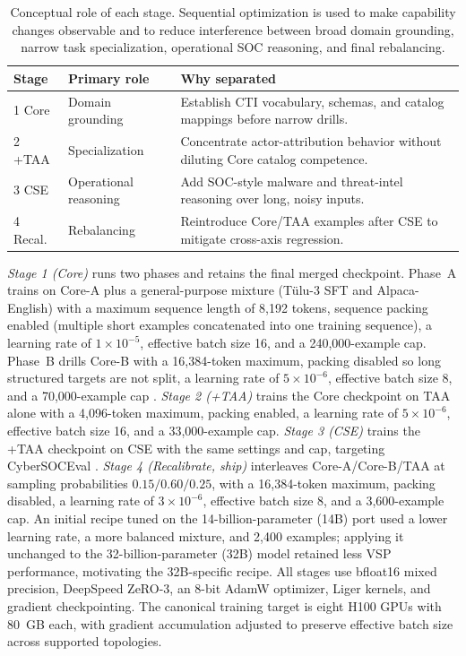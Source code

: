 \documentclass[conference]{IEEEtran}
\begin{document}
\begin{table}[t]
\centering
\caption{Conceptual role of each stage. Sequential optimization is used to make capability changes observable and to reduce interference between broad domain grounding, narrow task specialization, operational SOC reasoning, and final rebalancing.}
\label{tab:stage-rationale}
\footnotesize
\setlength{\tabcolsep}{3pt}
\begin{tabular}{p{1.05cm}p{2.0cm}p{3.65cm}}
\hline
\textbf{Stage} & \textbf{Primary role} & \textbf{Why separated} \\
\hline
1 Core & Domain grounding & Establish CTI vocabulary, schemas, and catalog mappings before narrow drills. \\
2 +TAA & Specialization & Concentrate actor-attribution behavior without diluting Core catalog competence. \\
3 CSE & Operational reasoning & Add SOC-style malware and threat-intel reasoning over long, noisy inputs. \\
4 Recal. & Rebalancing & Reintroduce Core/TAA examples after CSE to mitigate cross-axis regression. \\
\hline
\end{tabular}
\end{table}

\emph{Stage 1 (Core)} runs two phases and retains the final merged checkpoint. Phase~A trains on Core-A plus a general-purpose mixture (Tülu-3 SFT and Alpaca-English) with a maximum sequence length of 8,192 tokens, sequence packing enabled (multiple short examples concatenated into one training sequence), a learning rate of $1\times10^{-5}$, effective batch size 16, and a 240,000-example cap. Phase~B drills Core-B with a 16,384-token maximum, packing disabled so long structured targets are not split, a learning rate of $5\times10^{-6}$, effective batch size 8, and a 70,000-example cap \cite{alam2025athenabench,chung2022flant5,gururangan2020dontstop}. \emph{Stage 2 (+TAA)} trains the Core checkpoint on TAA alone with a 4,096-token maximum, packing enabled, a learning rate of $5\times10^{-6}$, effective batch size 16, and a 33,000-example cap. \emph{Stage 3 (CSE)} trains the +TAA checkpoint on CSE with the same settings and cap, targeting CyberSOCEval \cite{cybersoceval2025}. \emph{Stage 4 (Recalibrate, ship)} interleaves Core-A/Core-B/TAA at sampling probabilities $0.15/0.60/0.25$, with a 16,384-token maximum, packing disabled, a learning rate of $3\times10^{-6}$, effective batch size 8, and a 3,600-example cap. An initial recipe tuned on the 14-billion-parameter (14B) port used a lower learning rate, a more balanced mixture, and 2,400 examples; applying it unchanged to the 32-billion-parameter (32B) model retained less VSP performance, motivating the 32B-specific recipe. All stages use bfloat16 mixed precision, DeepSpeed ZeRO-3, an 8-bit AdamW optimizer, Liger kernels, and gradient checkpointing. The canonical training target is eight H100 GPUs with 80~GB each, with gradient accumulation adjusted to preserve effective batch size across supported topologies.
\end{document}

